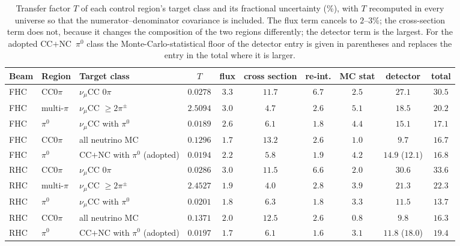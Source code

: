 \documentclass[11pt,a4paper]{article}
\begin{document}
\begin{table}[H]
  \centering
  \caption{Transfer factor $T$ of each control region's target class and its fractional uncertainty
    (\%), with $T$ recomputed in every universe so that the numerator--denominator covariance is
    included. The flux term cancels to $2$--$3\%$; the cross-section term does not, because it changes the
    composition of the two regions differently; the detector term is the largest. For the adopted
    CC$+$NC~$\pi^0$ class the Monte-Carlo-statistical floor of the detector entry is given in parentheses
    and replaces the entry in the total where it is larger.}
  \label{tab:cr_transfer_unc}
  \footnotesize\setlength{\tabcolsep}{3pt}
  \begin{tabular}{lllccccccc}
    \toprule
    Beam & Region & Target class & $T$ & flux & cross section & re-int. & MC stat & detector & total \\
    \midrule
    FHC & CC$0\pi$ & $\nu_\mu$CC $0\pi$ & $0.0278$ & $3.3$ & $11.7$ & $6.7$ & $2.5$ & $27.1$ & $30.5$ \\
    FHC & multi-$\pi$ & $\nu_\mu$CC $\geq2\pi^\pm$ & $2.5094$ & $3.0$ & $4.7$ & $2.6$ & $5.1$ & $18.5$ & $20.2$ \\
    FHC & $\pi^0$ & $\nu_\mu$CC with $\pi^0$ & $0.0189$ & $2.6$ & $6.1$ & $1.8$ & $4.4$ & $15.1$ & $17.1$ \\
    FHC & CC$0\pi$ & all neutrino MC & $0.1296$ & $1.7$ & $13.2$ & $2.6$ & $1.0$ & $9.7$ & $16.7$ \\
    FHC & $\pi^0$ & CC$+$NC with $\pi^0$ (adopted) & $0.0194$ & $2.2$ & $5.8$ & $1.9$ & $4.2$ & $14.9$ ($12.1$) & $16.8$ \\
    \midrule
    RHC & CC$0\pi$ & $\nu_\mu$CC $0\pi$ & $0.0286$ & $3.0$ & $11.5$ & $6.6$ & $2.0$ & $30.6$ & $33.6$ \\
    RHC & multi-$\pi$ & $\nu_\mu$CC $\geq2\pi^\pm$ & $2.4527$ & $1.9$ & $4.0$ & $2.8$ & $3.9$ & $21.3$ & $22.3$ \\
    RHC & $\pi^0$ & $\nu_\mu$CC with $\pi^0$ & $0.0201$ & $1.8$ & $6.3$ & $1.8$ & $3.3$ & $11.5$ & $13.7$ \\
    RHC & CC$0\pi$ & all neutrino MC & $0.1371$ & $2.0$ & $12.5$ & $2.6$ & $0.8$ & $9.8$ & $16.3$ \\
    RHC & $\pi^0$ & CC$+$NC with $\pi^0$ (adopted) & $0.0197$ & $1.7$ & $6.1$ & $1.6$ & $3.1$ & $11.8$ ($18.0$) & $19.4$ \\
    \bottomrule
  \end{tabular}
\end{table}
\end{document}

